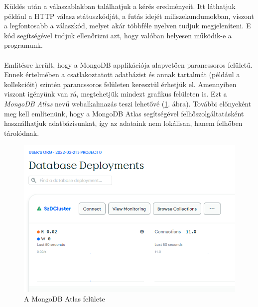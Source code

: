 Küldés után a válaszablakban találhatjuk a kérés eredményeit. Itt láthatjuk például a HTTP válasz státuszkódját, a futás idejét miliszekundumokban, viszont a legfontosabb a válaszkód, melyet akár többféle nyelven tudjuk megjeleníteni. E kód segítségével tudjuk ellenőrizni azt, hogy valóban helyesen működik-e a programunk.\\

\\

Említésre került, hogy a MongoDB applikációja alapvetően parancssoros felületű. Ennek értelmében a csatlakoztatott adatbázist és annak tartalmát (például a kollekcióit) szintén parancssoros felületen keresztül érhetjük el. Amennyiben viszont igényünk van rá, megtehetjük mindezt grafikus felületen is. Ezt a \textit{MongoDB Atlas} nevű webalkalmazás teszi lehetővé (\ref{fig:atlas}. ábra). További előnyeként meg kell említenünk, hogy a MongoDB Atlas segítségével felhőszolgáltatásként használhatjuk adatbázisunkat, így az adataink nem lokálisan, hanem felhőben tárolódnak.

\newpage

\begin{figure}[h]
	\centering
		\includegraphics[width=12truecm, height=7truecm]{images/atlas.png}
	\caption{A MongoDB Atlas felülete}
	\label{fig:atlas}
\end{figure}


